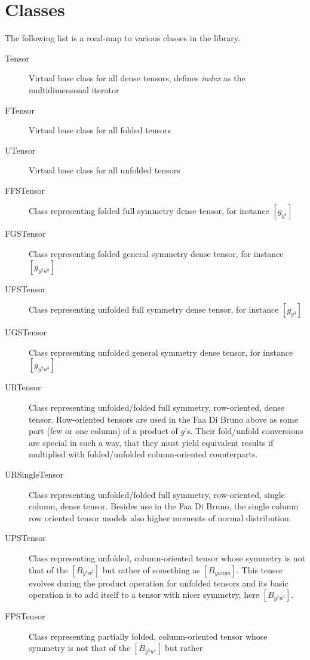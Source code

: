 \documentclass[11pt,a4paper]{article}
\begin{document}
\section{Classes}

The following list is a road-map to various classes in the library.

\begin{description}

\item[Tensor]
Virtual base class for all dense tensors, defines \emph{index} as the
multidimensonal iterator
\item[FTensor]
Virtual base class for all folded tensors
\item[UTensor]
Virtual base class for all unfolded tensors
\item[FFSTensor]
Class representing folded full symmetry dense tensor,
for instance $\left[g_{y^3}\right]$
\item[FGSTensor]
Class representing folded general symmetry dense tensor,
for instance $\left[g_{y^2u^3}\right]$
\item[UFSTensor]
Class representing unfolded full symmetry dense tensor,
for instance $\left[g_{y^3}\right]$
\item[UGSTensor]
Class representing unfolded general symmetry dense tensor,
for instance $\left[g_{y^2u^3}\right]$
\item[URTensor]
Class representing unfolded/folded full symmetry, row-oriented,
dense tensor. Row-oriented tensors are used in the Faa Di Bruno
above as some part (few or one column) of a product of $g$'s. Their
fold/unfold conversions are special in such a way, that they must
yield equivalent results if multiplied with folded/unfolded
column-oriented counterparts.
\item[URSingleTensor]
Class representing unfolded/folded full symmetry, row-oriented,
single column, dense tensor. Besides use in the Faa Di Bruno, the
single column row oriented tensor models also higher moments of normal
distribution.
\item[UPSTensor]
Class representing unfolded, column-oriented tensor whose symmetry
is not that of the $\left[B_{y^2u^3}\right]$ but rather of something
as $\left[B_{yuuyu}\right]$. This tensor evolves during the product
operation for unfolded tensors and its basic operation is to add
itself to a tensor with nicer symmetry, here $\left[B_{y^2u^3}\right]$.
\item[FPSTensor]
Class representing partially folded, column-oriented tensor whose
symmetry is not that of the $\left[B_{y^3u^4}\right]$ but rather

\end{description}
\end{document}
